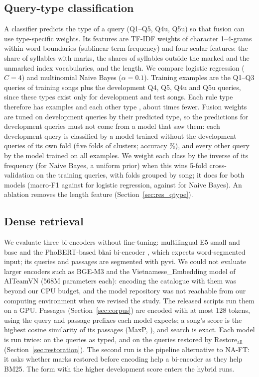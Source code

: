 \documentclass[11pt]{article}
\newcommand{\Qone}{Q1\xspace}
\newcommand{\Qthree}{Q3\xspace}
\newcommand{\Qfour}{Q4\xspace}
\newcommand{\Qfive}{Q5\xspace}
\newcommand{\Qfouru}{Q4u\xspace}
\newcommand{\Qfiveu}{Q5u\xspace}
\begin{document}
\subsection{Query-type classification}\label{sec:qtype}
A classifier predicts the type of a query (\Qone--\Qfive, \Qfouru, \Qfiveu) so that fusion can use
type-specific weights. Its
features are TF-IDF weights of character 1--4-grams within word boundaries (sublinear term frequency) and
four scalar features: the share of syllables with marks, the shares of syllables outside the marked and the
unmarked index vocabularies, and the length. We compare logistic regression ($C=4$) and multinomial Naive
Bayes ($\alpha = 0.1$). Training examples are the \Qone--\Qthree{} queries of training songs plus the
development \Qfour, \Qfive, \Qfouru{} and \Qfiveu{} queries, since these types exist only for development and
test songs. Each rule type therefore has \QtypeTrainRule{} examples and each other type \QtypeTrainFour, about
\QtypeTrainRatio{} times fewer. Fusion weights are tuned on development queries by their predicted type, so the
predictions for development queries must not come from a model that saw them: each development query is
classified by a model trained without the development queries of its own fold (five folds of clusters;
accuracy \QtypeDevAccOOF\%), and every other query by the model trained on all examples. We weight each class
by the inverse of its frequency (for Naive Bayes, a uniform prior) when this wins 5-fold cross-validation on
the training queries, with folds grouped by song; it does for both models (macro-F1 \QtypeCvBalancedLR{}
against \QtypeCvPlainLR{} for logistic regression, \QtypeCvBalancedNB{} against \QtypeCvPlainNB{} for Naive
Bayes). An ablation removes the length feature (Section~\ref{sec:res_qtype}).

\subsection{Dense retrieval}\label{sec:dense}
We evaluate three bi-encoders without fine-tuning: multilingual E5 small and base \citep{wang2024me5} and
the PhoBERT-based bkai bi-encoder \citep{bkai2023biencoder}, which expects word-segmented input; its queries
and passages are segmented with pyvi. We could not evaluate larger encoders such as BGE-M3 \citep{chen2024bgem3}
and the Vietnamese\_Embedding model of AITeamVN \citep{aiteamvn2025embedding} (568M parameters each): encoding
the catalogue with them was beyond our CPU budget, and the model repository was not reachable from our
computing environment when we revised the study. The released scripts run them on a GPU. Passages
(Section~\ref{sec:corpus}) are encoded with at most 128 tokens, using the query and passage prefixes each
model expects; a song's score is the highest cosine similarity of its passages (MaxP, \citep{dai2019maxp}),
and search is exact. Each model is run twice: on the queries as typed, and on the queries restored by
Restore$_{\mathrm{all}}$ (Section~\ref{sec:restoration}). The second run is the pipeline alternative to
NA-FT: it asks whether marks restored before encoding help a bi-encoder as they help BM25. The form with the
higher development score enters the hybrid runs.
\end{document}
